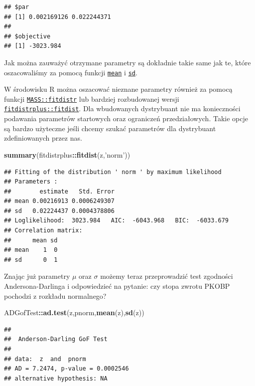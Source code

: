 \documentclass[polish,]{book}
\newenvironment{Shaded}{\begin{snugshade}}{\end{snugshade}}
\newcommand{\KeywordTok}[1]{\textcolor[rgb]{0.13,0.29,0.53}{\textbf{#1}}}
\newcommand{\NormalTok}[1]{#1}
\newcommand{\OperatorTok}[1]{\textcolor[rgb]{0.81,0.36,0.00}{\textbf{#1}}}
\newcommand{\StringTok}[1]{\textcolor[rgb]{0.31,0.60,0.02}{#1}}
\begin{document}
\begin{verbatim}
## $par
## [1] 0.002169126 0.022244371
## 
## $objective
## [1] -3023.984
\end{verbatim}

Jak można zauważyć otrzymane parametry są dokładnie takie same jak te, które
oszacowaliśmy za pomocą funkcji \href{https://rdrr.io/r/base/mean.html}{\texttt{mean}} i \href{https://rdrr.io/r/stats/sd.html}{\texttt{sd}}.

W środowisku R można oszacować nieznane parametry również za pomocą funkcji \href{https://rdrr.io/cran/MASS/man/fitdistr.html}{\texttt{MASS::fitdistr}} lub bardziej rozbudowanej wersji \href{https://rdrr.io/cran/fitdistrplus/man/fitdist.html}{\texttt{fitdistrplus::fitdist}}. Dla wbudowanych dystrybuant nie ma konieczności podawania parametrów startowych oraz ograniczeń przedziałowych. Takie opcje są bardzo użyteczne jeśli chcemy szukać parametrów dla dystrybuant zdefiniowanych przez nas.

\begin{Shaded}
\begin{Highlighting}[]
\KeywordTok{summary}\NormalTok{(fitdistrplus}\OperatorTok{::}\KeywordTok{fitdist}\NormalTok{(z,}\StringTok{'norm'}\NormalTok{))}
\end{Highlighting}
\end{Shaded}

\begin{verbatim}
## Fitting of the distribution ' norm ' by maximum likelihood 
## Parameters : 
##        estimate   Std. Error
## mean 0.00216913 0.0006249307
## sd   0.02224437 0.0004378806
## Loglikelihood:  3023.984   AIC:  -6043.968   BIC:  -6033.679 
## Correlation matrix:
##      mean sd
## mean    1  0
## sd      0  1
\end{verbatim}

Znając już parametry \(\mu\) oraz \(\sigma\) możemy teraz przeprowadzić test zgodności
Andersona-Darlinga i odpowiedzieć na pytanie: czy stopa zwrotu PKOBP pochodzi z rozkładu normalnego?

\begin{Shaded}
\begin{Highlighting}[]
\NormalTok{ADGofTest}\OperatorTok{::}\KeywordTok{ad.test}\NormalTok{(z,pnorm,}\KeywordTok{mean}\NormalTok{(z),}\KeywordTok{sd}\NormalTok{(z))}
\end{Highlighting}
\end{Shaded}

\begin{verbatim}
## 
##  Anderson-Darling GoF Test
## 
## data:  z  and  pnorm
## AD = 7.2474, p-value = 0.0002546
## alternative hypothesis: NA
\end{verbatim}
\end{document}
